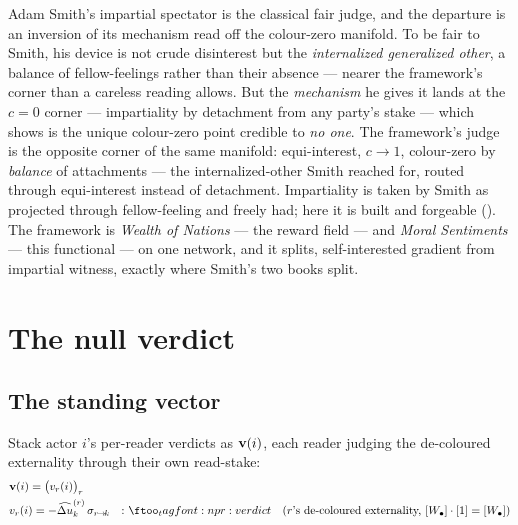 \documentclass[../main]{subfiles}
\begin{document}
\begin{econ}[label=e:smith, title={Both books on one network}, ref=pr:woven,
  cites={a:smithtms}, departs=flatten,
  stopsat={impartiality by detachment ($c{=}0$, credible to no one); the framework's judge is equi-interest ($c\to1$)}]
  Adam Smith's impartial spectator \parencite{a:smithtms} is the classical fair judge, and
  the departure is an inversion of its mechanism read off the colour-zero manifold. To be
  fair to Smith, his device is not crude disinterest but the \emph{internalized generalized
  other}, a balance of fellow-feelings rather than their absence --- nearer the framework's
  corner than a careless reading allows. But the \emph{mechanism} he gives it lands at the
  $c=0$ corner --- impartiality by detachment from any party's stake --- which 
  shows is the unique colour-zero point credible to \emph{no one}. The framework's judge is
  the opposite corner of the same manifold: equi-interest, $c\to1$, colour-zero by
  \emph{balance} of attachments --- the internalized-other Smith reached for, routed through
  equi-interest instead of detachment. Impartiality is taken by Smith as projected through
  fellow-feeling and freely had; here it is built and forgeable (). The
  framework is \emph{Wealth of Nations} --- the reward field  --- and \emph{Moral
  Sentiments} --- this functional --- on one network, and it splits, self-interested gradient
  from impartial witness, exactly where Smith's two books split.
\end{econ}

\clearpage
\section{The null verdict}
\label{sec:null-verdict}

\subsection{The standing vector}
\label{subsec:verd:standing}
%
\begin{definition}
  Stack actor $i$'s per-reader verdicts as $\mathbf{v}(i)$, each reader judging the de-coloured externality
  through their own read-stake:
  \begin{align}
    &\verdictstack{i} = \bigl(\readerverdict{r}{i}\bigr)_r \label{eq:pr:stand}\\
    &\readerverdict{r}{i} = -\reconstruct{k}{r}\,\lean{r}{k}
      &:& \eqtag{pr:verdict}{$r$'s de-coloured externality,
        $\dimwelfare\cdot\dimratio=\dimwelfare$}
  \end{align}
\end{definition}
\end{document}
